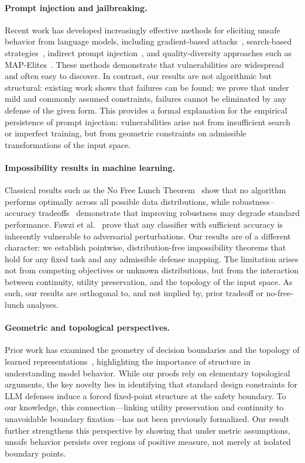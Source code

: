 \documentclass[11pt]{article}
\begin{document}
\paragraph{Prompt injection and jailbreaking.}
Recent work has developed increasingly effective methods for eliciting
unsafe behavior from language models, including gradient-based
attacks~\cite{zou2023universal}, search-based
strategies~\cite{chao2024jailbreaking,mehrotra2024tree}, indirect prompt
injection~\cite{greshake2023indirect}, and quality-diversity approaches
such as MAP-Elites~\cite{mouret2015illuminating,samvelyan2024rainbow}.
These methods demonstrate that vulnerabilities are widespread and often
easy to discover. In contrast, our results are not algorithmic but
structural: existing work shows that failures can be found; we prove
that under mild and commonly assumed constraints, failures cannot be
eliminated by any defense of the given form. This provides a formal
explanation for the empirical persistence of prompt injection:
vulnerabilities arise not from insufficient search or imperfect
training, but from geometric constraints on admissible transformations
of the input space.

\paragraph{Impossibility results in machine learning.}
Classical results such as the No Free Lunch
Theorem~\cite{wolpert1997no} show that no algorithm performs optimally
across all possible data distributions, while robustness--accuracy
tradeoffs~\cite{tsipras2018robustness} demonstrate that improving
robustness may degrade standard performance. Fawzi et
al.~\cite{fawzi2018adversarial} prove that any classifier with
sufficient accuracy is inherently vulnerable to adversarial
perturbations. Our results are of a different character: we establish
pointwise, distribution-free impossibility theorems that hold for any
fixed task and any admissible defense mapping. The limitation arises not
from competing objectives or unknown distributions, but from the
interaction between continuity, utility preservation, and the topology
of the input space. As such, our results are orthogonal to, and not
implied by, prior tradeoff or no-free-lunch analyses.

\paragraph{Geometric and topological perspectives.}
Prior work has examined the geometry of decision boundaries and the
topology of learned representations~\cite{naitzat2020topology},
highlighting the importance of structure in understanding model
behavior. While our proofs rely on elementary topological arguments,
the key novelty lies in identifying that standard design constraints
for LLM defenses induce a forced fixed-point structure at the safety
boundary. To our knowledge, this connection---linking utility
preservation and continuity to unavoidable boundary fixation---has not
been previously formalized. Our result further strengthens this
perspective by showing that under metric assumptions, unsafe behavior
persists over regions of positive measure, not merely at isolated
boundary points.
\end{document}
